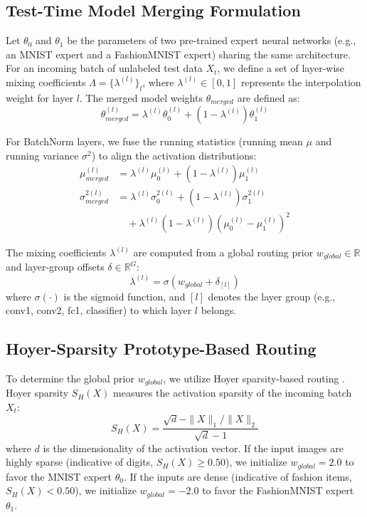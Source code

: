 \documentclass{article}
\theoremstyle{plain}
\theoremstyle{definition}
\theoremstyle{remark}
\begin{document}
\subsection{Test-Time Model Merging Formulation}
Let $\theta_0$ and $\theta_1$ be the parameters of two pre-trained expert neural networks (e.g., an MNIST expert and a FashionMNIST expert) sharing the same architecture. For an incoming batch of unlabeled test data $X_t$, we define a set of layer-wise mixing coefficients $\Lambda = \{\lambda^{(l)}\}_l$, where $\lambda^{(l)} \in [0, 1]$ represents the interpolation weight for layer $l$. The merged model weights $\theta_{merged}$ are defined as:
\begin{equation}
\theta_{merged}^{(l)} = \lambda^{(l)} \theta_0^{(l)} + (1 - \lambda^{(l)}) \theta_1^{(l)}
\end{equation}

For BatchNorm layers, we fuse the running statistics (running mean $\mu$ and running variance $\sigma^2$) to align the activation distributions:
\begin{align}
\mu_{merged}^{(l)} &= \lambda^{(l)} \mu_0^{(l)} + (1 - \lambda^{(l)}) \mu_1^{(l)} \\
\sigma_{merged}^{2 (l)} &= \lambda^{(l)} \sigma_0^{2 (l)} + (1 - \lambda^{(l)}) \sigma_1^{2 (l)} \nonumber \\
& \quad + \lambda^{(l)}(1 - \lambda^{(l)})(\mu_0^{(l)} - \mu_1^{(l)})^2
\end{align}

The mixing coefficients $\lambda^{(l)}$ are computed from a global routing prior $w_{global} \in \mathbb{R}$ and layer-group offsets $\delta \in \mathbb{R}^G$:
\begin{equation}
\lambda^{(l)} = \sigma(w_{global} + \delta_{[l]})
\end{equation}
where $\sigma(\cdot)$ is the sigmoid function, and $[l]$ denotes the layer group (e.g., conv1, conv2, fc1, classifier) to which layer $l$ belongs.

\subsection{Hoyer-Sparsity Prototype-Based Routing}
To determine the global prior $w_{global}$, we utilize Hoyer sparsity-based routing \cite{ahr_sats_dun}. Hoyer sparsity $S_H(X)$ measures the activation sparsity of the incoming batch $X_t$:
\begin{equation}
S_H(X) = \frac{\sqrt{d} - \|X\|_1 / \|X\|_2}{\sqrt{d} - 1}
\end{equation}
where $d$ is the dimensionality of the activation vector. If the input images are highly sparse (indicative of digits, $S_H(X) \ge 0.50$), we initialize $w_{global} = 2.0$ to favor the MNIST expert $\theta_0$. If the inputs are dense (indicative of fashion items, $S_H(X) < 0.50$), we initialize $w_{global} = -2.0$ to favor the FashionMNIST expert $\theta_1$.
\end{document}

